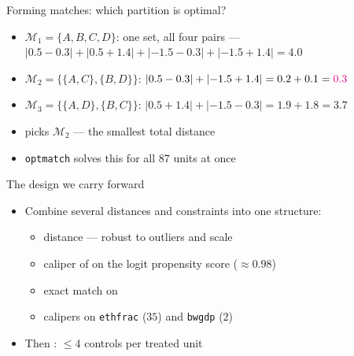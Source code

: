\documentclass[table, xcolor = {dvipsnames}, 9pt]{beamer}
\theoremstyle{plain}
\newcommand{\mh}[1]{{\color{magenta}{#1}}}
\begin{document}
\begin{frame}[t]{Forming matches: which partition is optimal?}
\vfill
\begin{itemize} \vfill
\item $\mathcal{M}_1 = \{A,B,C,D\}$: one set, all four pairs --- $|0.5 - 0.3| + |0.5 + 1.4| + |{-1.5} - 0.3| + |{-1.5} + 1.4| = 4.0$ \vfill
\item $\mathcal{M}_2 = \{\{A,C\}, \{B,D\}\}$: $|0.5 - 0.3| + |{-1.5} + 1.4| = 0.2 + 0.1 = \mh{0.3}$ \vfill
\item $\mathcal{M}_3 = \{\{A,D\}, \{B,C\}\}$: $|0.5 + 1.4| + |{-1.5} - 0.3| = 1.9 + 1.8 = 3.7$ \vfill
\item \mh{Optimal full matching} picks $\mathcal{M}_2$ --- the smallest total distance \vfill
\item \texttt{optmatch} solves this for all $87$ units at once \vfill
\end{itemize} \vfill
\end{frame}
\begin{frame}[t]{The design we carry forward}
\vfill
\begin{itemize} \vfill
\item Combine several distances and constraints into one structure: \vfill
\begin{itemize} \vfill
\item \mh{rank-based Mahalanobis} distance --- robust to outliers and scale \\ \citep[pp.~170--172]{rosenbaum2010} \vfill
\item caliper of \mh{$0.5$ SD} on the logit propensity score ($\approx 0.98$) \vfill
\item exact match on \mh{region} \vfill
\item calipers on \texttt{ethfrac} ($35$) and \texttt{bwgdp} ($2$) \vfill
\end{itemize} \vfill
\item Then \mh{full matching}: $\le 4$ controls per treated unit \vfill
\end{itemize} \vfill
\end{frame}
\end{document}
